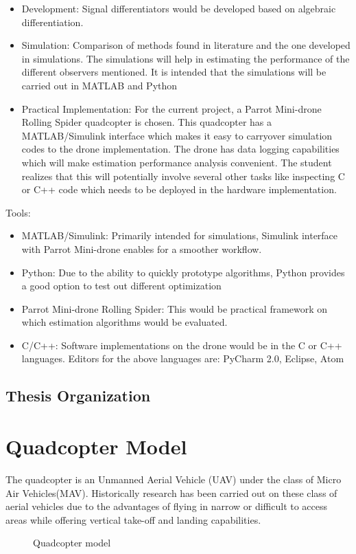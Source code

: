 \documentclass{article}
\begin{document}
\begin{itemize}
\item Development: Signal differentiators would be developed based on algebraic differentiation. 
\item Simulation: Comparison of methods found in literature and the one developed in simulations. The simulations will help in estimating the performance of the different observers mentioned. It is intended that the simulations will be carried out in MATLAB and Python
\item Practical Implementation: For the current project, a Parrot Mini-drone Rolling Spider quadcopter is chosen. This quadcopter has a MATLAB/Simulink interface which makes it easy to carryover simulation codes to the drone implementation. The drone has data logging capabilities which will make estimation performance analysis convenient. The student realizes that this will potentially involve several other tasks like inspecting C or C++ code which needs to be deployed in the hardware implementation.
\end{itemize}
	 
Tools: 
\begin{itemize}
\item MATLAB/Simulink: Primarily intended for simulations, Simulink interface with Parrot Mini-drone enables for a smoother workflow.
\item Python: Due to the ability to quickly prototype algorithms, Python provides a good option to test out different optimization
\item Parrot Mini-drone Rolling Spider: This would be practical framework on which estimation algorithms would be evaluated. 
\item C/C++: Software implementations on the drone would be in the C or C++ languages. 
Editors for the above languages are: PyCharm 2.0, Eclipse, Atom
\end{itemize}

\subsection{Thesis Organization}


\section{Quadcopter Model}
The quadcopter is an Unmanned Aerial Vehicle (UAV) under the class of Micro Air Vehicles(MAV). Historically research has been carried out on these class of aerial vehicles due to the advantages of flying in narrow or difficult to access areas while offering vertical take-off and landing capabilities. 
\begin{figure}
\centerline{}
\caption{Quadcopter model}
\label{quad_red_balls}
\end{figure}
\end{document}
